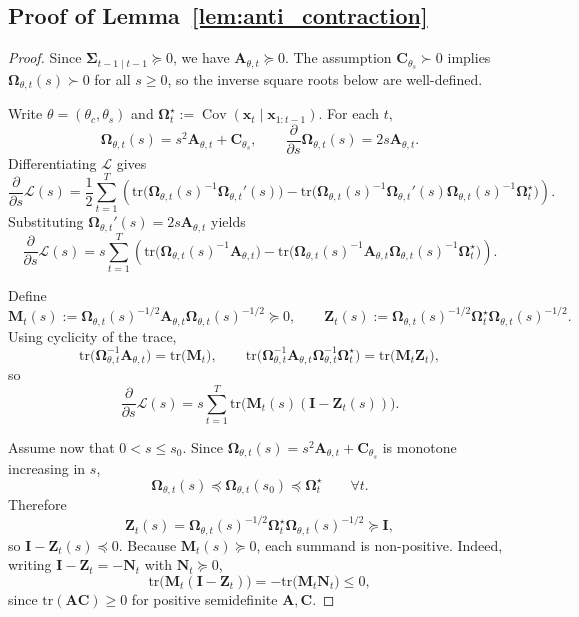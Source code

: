 \documentclass{article}
\theoremstyle{plain}
\theoremstyle{definition}
\theoremstyle{remark}
\newcommand{\tr}{\mathrm{tr}}
\begin{document}
\subsection{Proof of Lemma~\ref{lem:anti_contraction}}
\begin{proof}
Since $\bm\Sigma_{t-1\mid t-1}\succeq 0$, we have $\bm A_{\theta,t}\succeq 0$. The assumption $\bm C_{\theta_s}\succ0$ implies
$\bm\Omega_{\theta,t}(s)\succ0$ for all $s\ge0$, so the inverse square roots below are well-defined.

Write $\theta=(\theta_c,\theta_s)$ and $\bm \Omega_t^\star:=\operatorname{Cov}(\bm x_t\mid \bm x_{1:t-1})$. For each $t$,
\[
\bm \Omega_{\theta,t}(s)=s^2\bm A_{\theta,t}+\bm C_{\theta_s},
\qquad
\frac{\partial}{\partial s}\bm \Omega_{\theta,t}(s)=2s\bm A_{\theta,t}.
\]
Differentiating $\mathcal L$ gives
\[
\frac{\partial}{\partial s}\mathcal L(s)
=
\frac12\sum_{t=1}^T
\left(
\tr \big(\bm \Omega_{\theta,t}(s)^{-1}\bm \Omega_{\theta,t}'(s)\big)
-
\tr \big(\bm \Omega_{\theta,t}(s)^{-1}\bm \Omega_{\theta,t}'(s)\bm \Omega_{\theta,t}(s)^{-1}\bm \Omega_t^\star\big)
\right).
\]
Substituting $\bm \Omega_{\theta,t}'(s)=2s\bm A_{\theta,t}$ yields
\[
\frac{\partial}{\partial s}\mathcal L(s)
=
s\sum_{t=1}^T
\left(
\tr \big(\bm \Omega_{\theta,t}(s)^{-1}\bm A_{\theta,t}\big)
-
\tr \big(\bm \Omega_{\theta,t}(s)^{-1}\bm A_{\theta,t}\bm \Omega_{\theta,t}(s)^{-1}\bm \Omega_t^\star\big)
\right).
\]

Define
\[
\bm M_t(s):=\bm \Omega_{\theta,t}(s)^{-1/2}\bm A_{\theta,t}\bm \Omega_{\theta,t}(s)^{-1/2}\succeq 0,
\qquad
\bm Z_t(s):=\bm \Omega_{\theta,t}(s)^{-1/2}\bm \Omega_t^\star\bm \Omega_{\theta,t}(s)^{-1/2}.
\]
Using cyclicity of the trace,
\[
\tr \big(\bm \Omega_{\theta,t}^{-1}\bm A_{\theta,t}\big)=\tr \big(\bm M_t\big),
\qquad
\tr \big(\bm \Omega_{\theta,t}^{-1}\bm A_{\theta,t}\bm \Omega_{\theta,t}^{-1}\bm \Omega_t^\star\big)=\tr \big(\bm M_t\bm Z_t\big),
\]
so
\[
\frac{\partial}{\partial s}\mathcal L(s)
=
s\sum_{t=1}^T \tr \big(\bm M_t(s)(\bm I-\bm Z_t(s))\big).
\]

Assume now that $0<s\le s_0$. Since $\bm \Omega_{\theta,t}(s)=s^2\bm A_{\theta,t}+\bm C_{\theta_s}$ is monotone increasing in $s$,
\[
\bm \Omega_{\theta,t}(s)\preceq \bm \Omega_{\theta,t}(s_0)\preceq \bm \Omega_t^\star
\qquad \forall t.
\]
Therefore
\[
\bm Z_t(s)=\bm \Omega_{\theta,t}(s)^{-1/2}\bm \Omega_t^\star\bm \Omega_{\theta,t}(s)^{-1/2}\succeq \bm I,
\]
so $\bm I-\bm Z_t(s)\preceq 0$.
Because $\bm M_t(s)\succeq 0$, each summand is non-positive. Indeed, writing $\bm I-\bm Z_t=-\bm N_t$ with $\bm N_t\succeq 0$,
\[
\tr \big(\bm M_t(\bm I-\bm Z_t)\big)=-\tr \big(\bm M_t\bm N_t\big)\le 0,
\]
since $\tr(\bm A\bm C)\ge 0$ for positive semidefinite $\bm A,\bm C$.


\end{proof}
\end{document}
